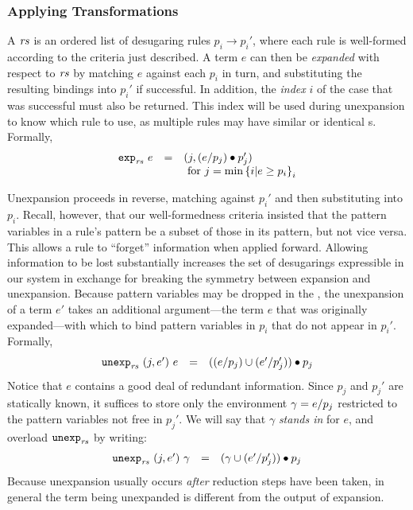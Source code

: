 \subsubsection{Applying Transformations}

A \emph{} $\mathit{rs}$ is an ordered list of desugaring
rules $p_i \to p_i'$, where each rule is well-formed according to the
criteria just described.
A term $e$ can then be \emph{expanded} with respect to
$\mathit{rs}$ by matching $e$ against each $p_i$ in turn, and substituting
the resulting bindings into $p_i'$ if successful. In addition, the
\emph{index} $i$ of the case that was successful
must also be returned. This index will be used during unexpansion
to know which rule to use, as multiple rules may have similar or identical
s. Formally,
\[\begin{array}{lllll}
   \texttt{exp}_{\mathit{rs}}\ {e} &=&
    (j, (e / p_j) \bullet p_j') \\
    &&\text{ for }
      j = \min \left\{ i | e \geq p_i \right\}_i \\
\end{array}\]

Unexpansion proceeds in reverse, matching against $p_i'$ and then
substituting into $p_i$. Recall, however, that our well-formedness
criteria insisted that the pattern variables in a rule's  pattern be a
subset of those in its  pattern, but not vice versa. This allows a
rule to ``forget'' information when applied forward. Allowing information
to be lost substantially increases the set of desugarings expressible in
our system in exchange for breaking the symmetry between expansion and
unexpansion. Because pattern variables may be dropped in the , the
unexpansion of a term $e'$ takes an additional argument---the term $e$
that was originally expanded---with which to bind pattern variables in $p_i$ that do not
appear in $p_i'$. Formally,
\[\begin{array}{lllll}
  \texttt{unexp}_{\mathit{rs}}\ {(j, e')}\ {e} &=&
    ((e / p_j) \cup (e' / p_j')) \bullet p_j
\end{array}\]
Notice that $e$ contains a good deal of redundant
information. Since $p_j$ and $p_j'$ are statically known, it
suffices to store only the environment $\gamma = e / p_j$
restricted to the pattern variables not free in $p_j'$. We will say that $\gamma$
\emph{stands in} for $e$, and overload $\textnormal{\texttt{unexp}}_{\mathit{rs}}$ by writing:
\[\begin{array}{lllll}
  \texttt{unexp}_{\mathit{rs}}\ {(j, e')}\ {\gamma} &=&
    (\gamma \cup (e' / p_j')) \bullet p_j
\end{array}\]
Because unexpansion usually occurs \emph{after} reduction steps have
been taken, in general the term being unexpanded is different
from the output of expansion.


